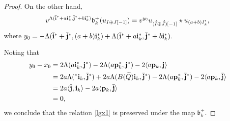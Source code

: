 \documentclass[reqno,12pt]{amsart}
\numberwithin{equation}{section}
\def\lr#1{\langle #1\rangle} \def\fin{\hfill$\square$}  \def\lra{\longrightarrow} \def\mod{\mbox{\rm \textbf{mod}}\,}\def\Mod{\mbox{\rm mod}\,}\def\top{\mbox{\rm top}\,}\def\soc{\mbox{\rm soc}\,}
\theoremstyle{plain} %
\theoremstyle{definition} %
\begin{document}
\begin{proof}
On the other hand,
\[v^{\Lambda(\bar{\bf i}^\ast+a{\bf i}_k^\ast,\bar{\bf j}^\ast+b{\bf i}_k^\ast)}\mathfrak{b}_k^+(u_{I\oplus J[-1]})=v^{y_0}u_{(\acute{\bar{I}}\oplus \acute{\bar{J}})[-1]}\star u_{(a+b)I_k'},\]
where
$y_0=-\Lambda(\bar{\bf i}^\ast+\bar{\bf j}^\ast, (a+b){\bf i}_k^\ast)+\Lambda(\bar{\bf i}^\ast+a{\bf i}_k^\ast,\bar{\bf j}^\ast+b{\bf i}_k^\ast).$


Noting that \begin{align*}y_0-x_0&=2\Lambda( a{\bf i}_k^\ast,\bar{\bf j}^\ast)-2\Lambda(a{\bf p}_k^\ast,{\bar{\bf j}}^\ast)-2\lr{a{\bf p}_k,\bar{\bf j}}\\&=2a\Lambda( {^*{\bf i}_k},\bar{\bf j}^\ast)+2a\Lambda( {B(\widetilde{Q}){\bf i}_k},\bar{\bf j}^\ast)-2\Lambda(a{\bf p}_k^\ast,{\bar{\bf j}}^\ast)-2\lr{a{\bf p}_k,\bar{\bf j}}\\
&=2a\lr{ {\bar{\bf j},{\bf i}_k}}-2a\lr{{\bf p}_k,\bar{\bf j}}\\&=0,\end{align*} we conclude that the relation \eqref{lgx1} is preserved under the map $\mathfrak{b}_k^+$.


\end{proof}
\end{document}
